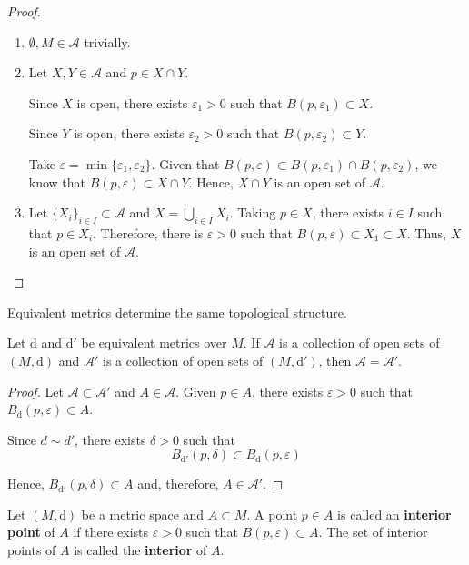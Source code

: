 \begin{proof}
    \begin{enumerate}
        \item $\emptyset, M \in \mathcal{A}$ trivially.
        \item Let $X, Y \in \mathcal{A}$ and $p \in X \cap Y$. 
        
        Since $X$ is open, there exists $\varepsilon_1 > 0$ such that $B(p, \varepsilon_1) \subset X$.

        Since $Y$ is open, there exists $\varepsilon_2 > 0$ such that $B(p, \varepsilon_2) \subset Y$.

        Take $\varepsilon = \min \{ \varepsilon_1, \varepsilon_2 \}$. Given that $B(p, \varepsilon) \subset B(p, \varepsilon_1) \cap B(p, \varepsilon_2)$, we know that $B(p, \varepsilon) \subset X \cap Y$. Hence, $X \cap Y$ is an open set of $\mathcal{A}$.

        \item Let $\{ X_i \}_{i \in I} \subset \mathcal{A}$ and $X = \bigcup_{i \in I} X_i$. Taking $p \in X$, there exists $i \in I$ such that $p \in X_i$. Therefore, there is $\varepsilon > 0$ such that $B(p, \varepsilon) \subset X_1 \subset X$. Thus, $X$ is an open set of $\mathcal{A}$.
    \end{enumerate}
\end{proof}

Equivalent metrics determine the same topological structure.

\begin{proposition}
    Let $\mathrm{d}$ and $\mathrm{d}'$ be equivalent metrics over $M$. If $\mathcal{A}$ is a collection of open sets of $(M, \mathrm{d})$ and $\mathcal{A}'$ is a collection of open sets of $(M, \mathrm{d}')$, then $\mathcal{A} = \mathcal{A}'$.
\end{proposition}

\begin{proof}
    Let $\mathcal{A} \subset \mathcal{A}'$ and $A \in \mathcal{A}$. Given $p \in A$, there exists $\varepsilon > 0$ such that $B_{\mathrm{d}}(p, \varepsilon) \subset A$.

    Since $d \sim d'$, there exists $\delta > 0$ such that
    \[
        B_{\mathrm{d}'}(p, \delta) \subset B_{\mathrm{d}}(p, \varepsilon)
    \]

    Hence, $B_{\mathrm{d}'}(p, \delta) \subset A$ and, therefore, $A \in \mathcal{A}'$.
\end{proof}

\begin{definition}
    Let $(M, \mathrm{d})$ be a metric space and $A \subset M$. A point $p \in A$ is called an \textbf{interior point} of $A$ if there exists $\varepsilon > 0$ such that $B(p, \varepsilon) \subset A$. The set of interior points of $A$ is called the \textbf{interior} of $A$.
\end{definition}


